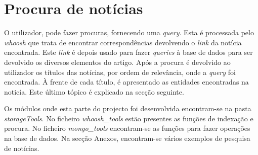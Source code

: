 \section{Procura de notícias}
O utilizador, pode fazer procuras, fornecendo uma \textit{query}. Esta é processada pelo \textit{whoosh} que trata de encontrar correspondências devolvendo o \textit{link} da notícia encontrada. Este \textit{link} é depois usado para fazer \textit{queries} à base de dados para ser devolvido os diversos elementos do artigo. Após a procura é devolvido ao utilizador os títulos das notícias, por ordem de relevância, onde a \textit{query} foi encontrada. À frente de cada título, é apresentado as entidades encontradas na noticía. Este último tópico é explicado na secção seguinte.

Os módulos onde esta parte do projecto foi desenvolvida encontram-se na pasta \textit{storageTools}. No ficheiro \textit{whoosh\_tools} estão presentes as funções de indexação e procura. No ficheiro \textit{mongo\_tools} encontram-se as funções para fazer operações na base de dados.
Na secção Anexos, encontram-se vários exemplos de pesquisa de notícias.